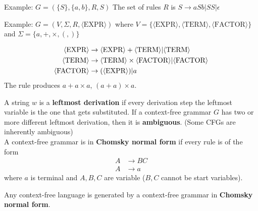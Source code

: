 \documentclass[12pt]{article}
\begin{document}
Example: $G = (\{S\}, \{a, b\}, R, S)$ The set of rules $R$ is $S \rightarrow aSb | SS | \epsilon$

Example: $G = (V, \Sigma, R, \langle \text{EXPR} \rangle )$ where $V = \{ \langle \text{EXPR} \rangle, \langle \text{TERM} \rangle, \langle \text{FACTOR} \rangle\}$ and $\Sigma = \{a, +, \times, (, ) \}$ 


\begin{equation*}
	\begin{split}
		\langle \text{EXPR} \rangle &\rightarrow \langle \text{EXPR} \rangle + \langle \text{TERM} \rangle | \langle \text{TERM} \rangle \\
		\langle \text{TERM} \rangle  &\rightarrow \langle \text{TERM} \rangle \times \langle \text{FACTOR} \rangle | \langle \text{FACTOR} \rangle \\
		\langle \text{FACTOR} \rangle &\rightarrow (\langle \text{EXPR} \rangle) | \space a
	\end{split}
\end{equation*}
The rule produces $a+ a \times a$, $(a +a) \times a$.

A string $w$ is a \textbf{leftmost derivation} if every derivation step the leftmost variable is the one that gets substituted. If a context-free grammar $G$ has two or more different leftmost derivation, then it is \textbf{ambiguous}. (Some CFGs are inherently ambiguous) \\

A context-free grammar is in \textbf{Chomsky normal form} if every rule is of the form 
\begin{equation*}
	\begin{split}
		A &\rightarrow BC \\
		A &\rightarrow a
	\end{split}
\end{equation*}
where $a$ is terminal and $A,B,C$ are variable ($B,C$ cannot be start variables).

\begin{theorem}
	Any context-free language is generated by a context-free grammar in \textbf{Chomsky normal form}.
\end{theorem}
\end{document}
